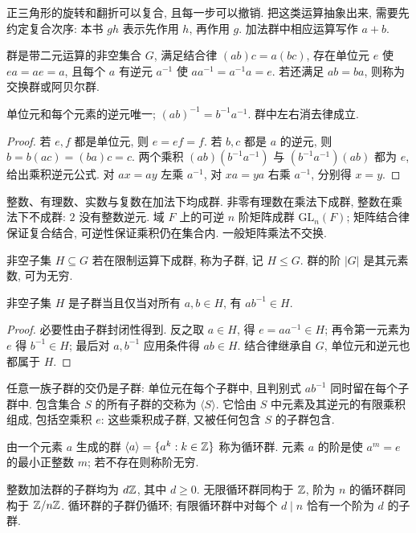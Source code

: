 正三角形的旋转和翻折可以复合, 且每一步可以撤销. 把这类运算抽象出来, 需要先约定复合次序: 本书 $gh$ 表示先作用 $h$, 再作用 $g$. 加法群中相应运算写作 $a+b$.
\begin{definition}
群是带二元运算的非空集合 $G$, 满足结合律 $(ab)c=a(bc)$, 存在单位元 $e$ 使 $ea=ae=a$, 且每个 $a$ 有逆元 $a^{-1}$ 使 $aa^{-1}=a^{-1}a=e$. 若还满足 $ab=ba$, 则称为交换群或阿贝尔群.
\end{definition}
\begin{proposition}
单位元和每个元素的逆元唯一; $(ab)^{-1}=b^{-1}a^{-1}$. 群中左右消去律成立.
\end{proposition}
\begin{proof}
若 $e,f$ 都是单位元, 则 $e=ef=f$. 若 $b,c$ 都是 $a$ 的逆元, 则 $b=b(ac)=(ba)c=c$. 两个乘积 $(ab)(b^{-1}a^{-1})$ 与 $(b^{-1}a^{-1})(ab)$ 都为 $e$, 给出乘积逆元公式. 对 $ax=ay$ 左乘 $a^{-1}$, 对 $xa=ya$ 右乘 $a^{-1}$, 分别得 $x=y$.
\end{proof}
整数、有理数、实数与复数在加法下均成群. 非零有理数在乘法下成群, 整数在乘法下不成群: $2$ 没有整数逆元. 域 $F$ 上的可逆 $n$ 阶矩阵成群 $\mathrm{GL}_n(F)$; 矩阵结合律保证复合结合, 可逆性保证乘积仍在集合内. 一般矩阵乘法不交换.
\begin{definition}
非空子集 $H\subseteq G$ 若在限制运算下成群, 称为子群, 记 $H\le G$. 群的阶 $|G|$ 是其元素数, 可为无穷.
\end{definition}
\begin{proposition}[子群判别]
非空子集 $H$ 是子群当且仅当对所有 $a,b\in H$, 有 $ab^{-1}\in H$.
\end{proposition}
\begin{proof}
必要性由子群封闭性得到. 反之取 $a\in H$, 得 $e=aa^{-1}\in H$; 再令第一元素为 $e$ 得 $b^{-1}\in H$; 最后对 $a,b^{-1}$ 应用条件得 $ab\in H$. 结合律继承自 $G$, 单位元和逆元也都属于 $H$.
\end{proof}
任意一族子群的交仍是子群: 单位元在每个子群中, 且判别式 $ab^{-1}$ 同时留在每个子群中. 包含集合 $S$ 的所有子群的交称为 $\langle S\rangle$. 它恰由 $S$ 中元素及其逆元的有限乘积组成, 包括空乘积 $e$: 这些乘积成子群, 又被任何包含 $S$ 的子群包含.
\begin{definition}
由一个元素 $a$ 生成的群 $\langle a\rangle=\{a^k:k\in\mathbb Z\}$ 称为循环群. 元素 $a$ 的阶是使 $a^m=e$ 的最小正整数 $m$; 若不存在则称阶无穷.
\end{definition}
\begin{theorem}\label{thm:cyclic}
整数加法群的子群均为 $d\mathbb Z$, 其中 $d\ge0$. 无限循环群同构于 $\mathbb Z$, 阶为 $n$ 的循环群同构于 $\mathbb Z/n\mathbb Z$. 循环群的子群仍循环; 有限循环群中对每个 $d\mid n$ 恰有一个阶为 $d$ 的子群.
\end{theorem}
